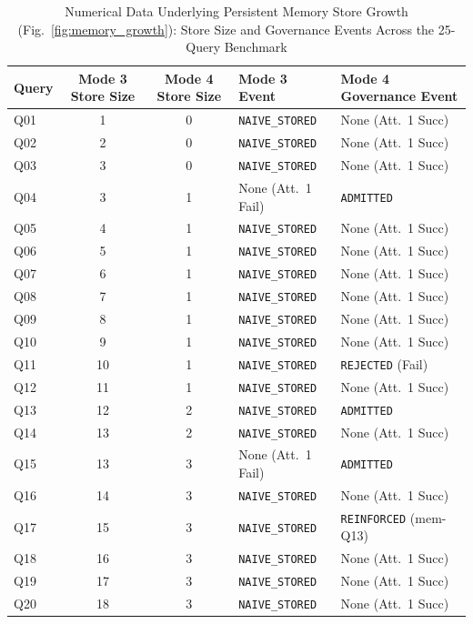 \begin{table}[t]
\centering
\caption{Numerical Data Underlying Persistent Memory Store Growth (Fig.~\ref{fig:memory_growth}): Store Size and Governance Events Across the 25-Query Benchmark}
\label{tab:fig6_validation}
\footnotesize
\setlength{\tabcolsep}{12pt}
\renewcommand{\arraystretch}{1.03}
\begin{tabular}{l c c l l}
\toprule
\textbf{Query} & \textbf{Mode 3 Store Size} & \textbf{Mode 4 Store Size} & \textbf{Mode 3 Event} & \textbf{Mode 4 Governance Event} \\
\midrule
Q01 & 1 & 0 & \texttt{NAIVE\_STORED} & None (Att.~1 Succ) \\
Q02 & 2 & 0 & \texttt{NAIVE\_STORED} & None (Att.~1 Succ) \\
Q03 & 3 & 0 & \texttt{NAIVE\_STORED} & None (Att.~1 Succ) \\
Q04 & 3 & 1 & None (Att.~1 Fail) & \texttt{ADMITTED} \\
Q05 & 4 & 1 & \texttt{NAIVE\_STORED} & None (Att.~1 Succ) \\
Q06 & 5 & 1 & \texttt{NAIVE\_STORED} & None (Att.~1 Succ) \\
Q07 & 6 & 1 & \texttt{NAIVE\_STORED} & None (Att.~1 Succ) \\
Q08 & 7 & 1 & \texttt{NAIVE\_STORED} & None (Att.~1 Succ) \\
Q09 & 8 & 1 & \texttt{NAIVE\_STORED} & None (Att.~1 Succ) \\
Q10 & 9 & 1 & \texttt{NAIVE\_STORED} & None (Att.~1 Succ) \\
Q11 & 10 & 1 & \texttt{NAIVE\_STORED} & \texttt{REJECTED} (Fail) \\
Q12 & 11 & 1 & \texttt{NAIVE\_STORED} & None (Att.~1 Succ) \\
Q13 & 12 & 2 & \texttt{NAIVE\_STORED} & \texttt{ADMITTED} \\
Q14 & 13 & 2 & \texttt{NAIVE\_STORED} & None (Att.~1 Succ) \\
Q15 & 13 & 3 & None (Att.~1 Fail) & \texttt{ADMITTED} \\
Q16 & 14 & 3 & \texttt{NAIVE\_STORED} & None (Att.~1 Succ) \\
Q17 & 15 & 3 & \texttt{NAIVE\_STORED} & \texttt{REINFORCED} (mem-Q13) \\
Q18 & 16 & 3 & \texttt{NAIVE\_STORED} & None (Att.~1 Succ) \\
Q19 & 17 & 3 & \texttt{NAIVE\_STORED} & None (Att.~1 Succ) \\
Q20 & 18 & 3 & \texttt{NAIVE\_STORED} & None (Att.~1 Succ) \\

\end{tabular}
\end{table}
